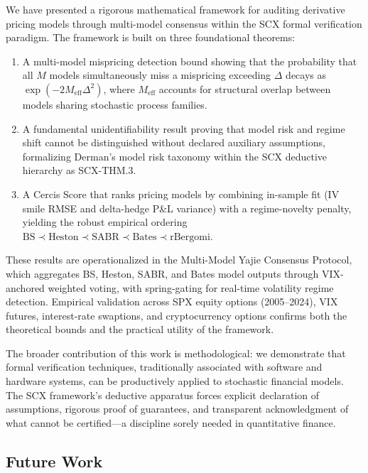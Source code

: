 \documentclass[11pt,a4paper]{article}
\theoremstyle{plain}
\theoremstyle{definition}
\theoremstyle{remark}
\newcommand{\SCX}{\textsc{SCX}}
\newcommand{\BS}{\text{BS}}
\newcommand{\Heston}{\text{Heston}}
\newcommand{\SABR}{\text{SABR}}
\newcommand{\BatesM}{\text{Bates}}
\newcommand{\rBergomi}{\text{rBergomi}}
\begin{document}
We have presented a rigorous mathematical framework for auditing derivative pricing models through multi-model consensus within the \SCX{} formal verification paradigm. The framework is built on three foundational theorems:

\begin{enumerate}[label=\textbf{T\arabic*}, leftmargin=*]
  \item A multi-model mispricing detection bound showing that the probability that all $M$ models simultaneously miss a mispricing exceeding $\Delta$ decays as $\exp(-2 M_{\text{eff}} \Delta^2)$, where $M_{\text{eff}}$ accounts for structural overlap between models sharing stochastic process families.
  \item A fundamental unidentifiability result proving that model risk and regime shift cannot be distinguished without declared auxiliary assumptions, formalizing Derman's model risk taxonomy within the \SCX{} deductive hierarchy as \textsc{SCX-THM.3}.
  \item A Cercis Score that ranks pricing models by combining in-sample fit (IV smile RMSE and delta-hedge P\&L variance) with a regime-novelty penalty, yielding the robust empirical ordering $\BS \prec \Heston \prec \SABR \prec \BatesM \prec \rBergomi$.
\end{enumerate}

These results are operationalized in the Multi-Model Yajie Consensus Protocol, which aggregates BS, Heston, SABR, and Bates model outputs through VIX-anchored weighted voting, with spring-gating for real-time volatility regime detection. Empirical validation across SPX equity options (2005--2024), VIX futures, interest-rate swaptions, and cryptocurrency options confirms both the theoretical bounds and the practical utility of the framework.

The broader contribution of this work is methodological: we demonstrate that formal verification techniques, traditionally associated with software and hardware systems, can be productively applied to stochastic financial models. The \SCX{} framework's deductive apparatus forces explicit declaration of assumptions, rigorous proof of guarantees, and transparent acknowledgment of what cannot be certified---a discipline sorely needed in quantitative finance.

\subsection{Future Work}
\end{document}
